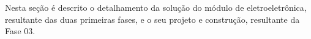 \label{desenvolvimento_eletroeletronica}

Nesta seção é descrito o detalhamento da solução do módulo de eletroeletrônica, resultante das duas primeiras fases,
e o seu projeto e construção, resultante da Fase 03.







